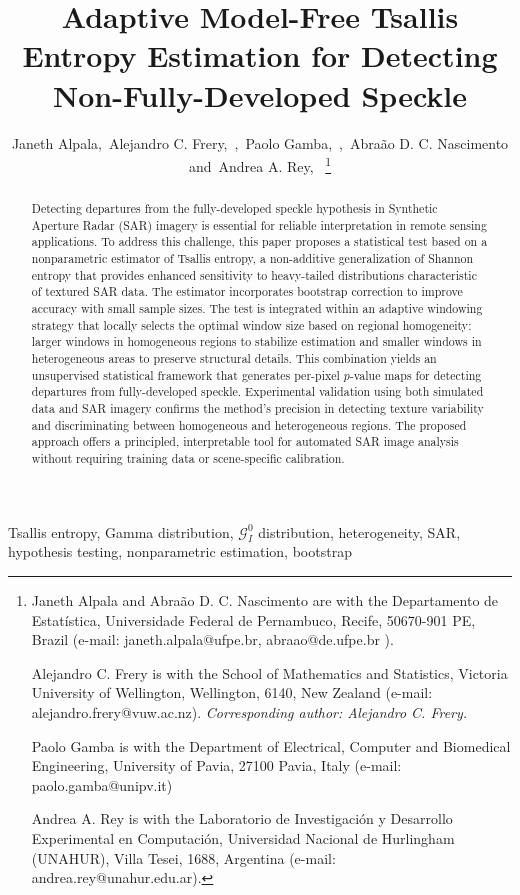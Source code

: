 \documentclass[
  lettersize  journal,
]{IEEEtran}%
\title{Adaptive Model-Free Tsallis Entropy Estimation for Detecting
Non-Fully-Developed Speckle}
\author{
Janeth Alpala\orcidlink{0000-0002-0265-6236},~Alejandro C.
Frery\orcidlink{0000-0002-8002-5341},~\IEEEmembership{Life Fellow,
IEEE},~Paolo
Gamba\orcidlink{0000-0002-9576-6337},~\IEEEmembership{Fellow,
IEEE},~Abraão D. C. Nascimento\orcidlink{0000-0003-2673-219X}
and~Andrea A.
Rey\orcidlink{0000-0002-9185-1382},~\IEEEmembership{Member, IEEE}%
\thanks{Janeth Alpala and Abraão D. C. Nascimento are with the
Departamento de Estatística, Universidade Federal de Pernambuco, Recife,
50670-901 PE, Brazil (e-mail: janeth.alpala@ufpe.br, abraao@de.ufpe.br
).

Alejandro C. Frery is with the School of Mathematics and Statistics,
Victoria University of Wellington, Wellington, 6140, New Zealand
(e-mail: alejandro.frery@vuw.ac.nz).
\emph{Corresponding author: Alejandro C. Frery.}

Paolo Gamba is with the Department of Electrical, Computer and
Biomedical Engineering, University of Pavia, 27100 Pavia, Italy (e-mail:
paolo.gamba@unipv.it)

Andrea A. Rey is with the Laboratorio de Investigación y Desarrollo
Experimental en Computación, Universidad Nacional de Hurlingham
(UNAHUR), Villa Tesei, 1688, Argentina (e-mail:
andrea.rey@unahur.edu.ar).}
}
\begin{document}


\maketitle

\begin{abstract}
Detecting departures from the fully-developed speckle hypothesis in
Synthetic Aperture Radar (SAR) imagery is essential for reliable
interpretation in remote sensing applications. To address this
challenge, this paper proposes a statistical test based on a
nonparametric estimator of Tsallis entropy, a non-additive
generalization of Shannon entropy that provides enhanced sensitivity to
heavy-tailed distributions characteristic of textured SAR data. The
estimator incorporates bootstrap correction to improve accuracy with
small sample sizes. The test is integrated within an adaptive windowing
strategy that locally selects the optimal window size based on regional
homogeneity: larger windows in homogeneous regions to stabilize
estimation and smaller windows in heterogeneous areas to preserve
structural details. This combination yields an unsupervised statistical
framework that generates per-pixel \(p\)-value maps for detecting
departures from fully-developed speckle. Experimental validation using
both simulated data and SAR imagery confirms the method's precision in
detecting texture variability and discriminating between homogeneous and
heterogeneous regions. The proposed approach offers a principled,
interpretable tool for automated SAR image analysis without requiring
training data or scene-specific calibration.
\end{abstract}
\begin{IEEEkeywords}
Tsallis entropy, Gamma distribution, \(\mathcal{G}_I^0\)
distribution, heterogeneity, SAR, hypothesis testing, nonparametric
estimation, bootstrap
\end{IEEEkeywords}

%
\end{document}
